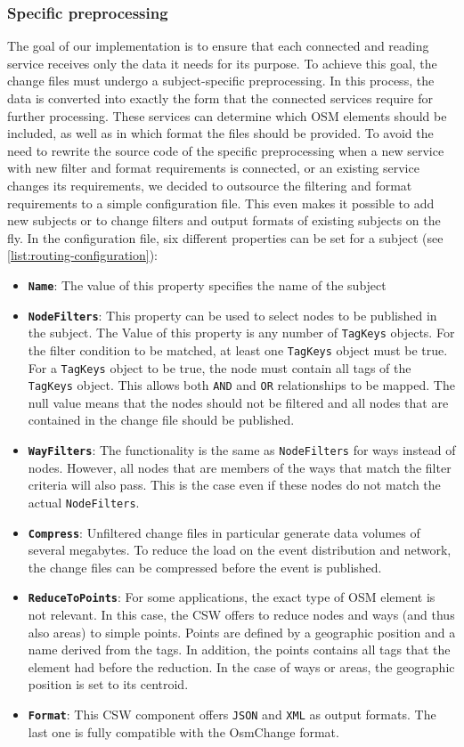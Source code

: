 \documentclass[conference]{IEEEtran}
\begin{document}
\subsubsection{Specific preprocessing}
The goal of our implementation is to ensure that each connected and reading service receives only the data it needs for its purpose. To achieve this goal, the change files must undergo a subject-specific preprocessing. In this process, the data is converted into exactly the form that the connected services require for further processing. These services can determine which OSM elements should be included, as well as in which format the files should be provided. To avoid the need to rewrite the source code of the specific preprocessing when a new service with new filter and format requirements is connected, or an existing service changes its requirements, we decided to outsource the filtering and format requirements to a simple configuration file. This even makes it possible to add new subjects or to change filters and output formats of existing subjects on the fly. In the configuration file, six different properties can be set for a subject (see \autoref{list:routing-configuration}):
\begin{itemize}
    \item \textbf{\texttt{Name}}: The value of this property specifies the name of the subject
    \item \textbf{\texttt{NodeFilters}}: This property can be used to select nodes to be published in the subject. The Value of this property is any number of \texttt{TagKeys} objects. For the filter condition to be matched, at least one \texttt{TagKeys} object must be true. For a \texttt{TagKeys} object to be true, the node must contain all tags of the \texttt{TagKeys} object. This allows both \texttt{AND} and \texttt{OR} relationships to be mapped. The null value means that the nodes should not be filtered and all nodes that are contained in the change file should be published.
    \item \textbf{\texttt{WayFilters}}: The functionality is the same as \texttt{NodeFilters} for ways instead of nodes. However, all nodes that are members of the ways that match the filter criteria will also pass. This is the case even if these nodes do not match the actual \texttt{NodeFilters}.
    \item \textbf{\texttt{Compress}}: Unfiltered change files in particular generate data volumes of several megabytes. To reduce the load on the event distribution and network, the change files can be compressed before the event is published.
    \item \textbf{\texttt{ReduceToPoints}}: For some applications, the exact type of OSM element is not relevant. In this case, the CSW offers to reduce nodes and ways (and thus also areas) to simple points. Points are defined by a geographic position and a name derived from the tags. In addition, the points contains all tags that the element had before the reduction. In the case of ways or areas, the geographic position is set to its centroid.
    \item \textbf{\texttt{Format}}: This CSW component offers \texttt{JSON} and \texttt{XML} as output formats. The last one is fully compatible with the OsmChange format.
\end{itemize}
\end{document}
